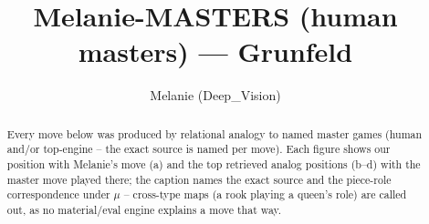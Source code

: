 \documentclass[11pt]{article}
\title{Melanie-MASTERS (human masters) — Grunfeld}
\author{Melanie (Deep\_Vision)}
\date{}
\begin{document}
\maketitle

\begin{abstract}Every move below was produced by relational analogy to named master games (human and/or top-engine -- the exact source is named per move). Each figure shows our position with Melanie's move (a) and the top retrieved analog positions (b--d) with the master move played there; the caption names the exact source and the piece-role correspondence under $\mu$ -- cross-type maps (a rook playing a queen's role) are called out, as no material/eval engine explains a move that way.\end{abstract}

\begin{figure}[p]\centering
\begin{subfigure}{0.46\textwidth}\centering
\resizebox{\linewidth}{!}{%
\newchessgame
\chessboard[
  setfen={rnbqk2r/ppp1ppbp/6p1/8/3PP3/2P5/P4PPP/R1BQKBNR w KQkq - 1 7},
  showmover=false,
  pgfstyle=straightmove, color=movearrow, markmove={c1-g5}
]}
\caption{}
\end{subfigure}\hfill
\begin{subfigure}{0.46\textwidth}\centering
\resizebox{\linewidth}{!}{%
\newchessgame
\chessboard[
  setfen={r3kb1r/1p1qpp1p/pn4p1/8/3P4/N7/PP3PPP/R1BQR1K1 w kq - 2 15},
  showmover=false,
  pgfstyle=straightmove, color=movearrow, markmove={c1-g5}
]}
\caption{}
\end{subfigure}
\\[4pt]
\begin{subfigure}{0.46\textwidth}\centering
\resizebox{\linewidth}{!}{%
\newchessgame
\chessboard[
  setfen={r1bq1rk1/ppp2pbp/6p1/3n4/8/3B2NP/PPP2PP1/R1BQR1K1 w - - 2 14},
  showmover=false,
  pgfstyle=straightmove, color=movearrow, markmove={c2-c3}
]}
\caption{}
\end{subfigure}\hfill
\begin{subfigure}{0.46\textwidth}\centering
\resizebox{\linewidth}{!}{%
\newchessgame
\chessboard[
  setfen={r1bq1rk1/1pp1b1pp/p1p5/6p1/2PP4/4B3/PP3PPP/RN1QR1K1 w - - 0 14},
  showmover=false,
  pgfstyle=straightmove, color=movearrow, markmove={b1-c3}
]}
\caption{}
\end{subfigure}

\end{figure}
\end{document}
